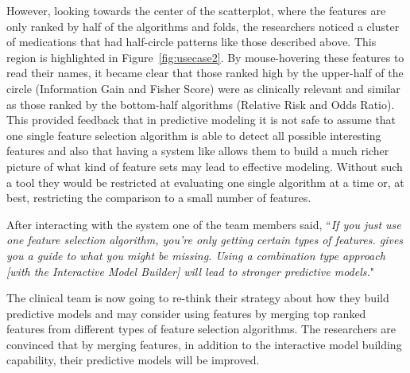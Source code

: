 However, looking towards the center of the scatterplot,
where the features are only ranked by half of the algorithms and folds,
the researchers noticed a cluster of medications that
had half-circle patterns like those described above. This region is highlighted in Figure~\ref{fig:usecase2}. By mouse-hovering these features to read their names, it became clear that those ranked high by the upper-half of the circle (Information Gain and Fisher Score) were as clinically relevant and similar as those ranked by the bottom-half algorithms (Relative Risk and Odds Ratio). This provided feedback that in predictive modeling it is not safe to assume that one single feature selection algorithm is able to detect all possible interesting features and also that having a system like \infuse allows them to build a much richer picture of what kind of feature sets may lead to effective modeling. Without such a tool they would be restricted at evaluating one single algorithm at a time or, at best, restricting the comparison to a small number of features.


After interacting with the system one of the team members said, ``\textit{If you just use one feature selection algorithm, you're only getting certain types of features. \infuse gives you a guide to what you might be missing. Using a combination type approach [with the Interactive Model Builder] will lead to stronger predictive models.}"

The clinical team is now going to re-think their strategy about how they
build predictive models and may consider using features by merging top
ranked features from different types of feature selection algorithms.
The researchers are convinced that by merging features, in addition
to the interactive model building capability, their predictive models will be improved.

